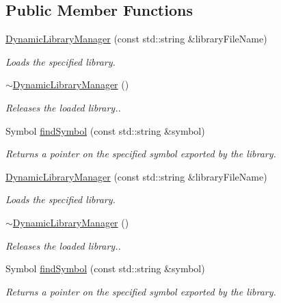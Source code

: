 \subsection*{Public Member Functions}
\begin{DoxyCompactItemize}
\item 
\hyperlink{class_dynamic_library_manager_ab7ae32f147f2cdd809df718d70fc7ff2}{Dynamic\+Library\+Manager} (const std\+::string \&library\+File\+Name)
\begin{DoxyCompactList}\small\item\em Loads the specified library. \end{DoxyCompactList}\item 
\hypertarget{class_dynamic_library_manager_a1c6a30a61161a8ddb96279bfb44c44c7}{\hyperlink{class_dynamic_library_manager_a1c6a30a61161a8ddb96279bfb44c44c7}{$\sim$\+Dynamic\+Library\+Manager} ()}\label{class_dynamic_library_manager_a1c6a30a61161a8ddb96279bfb44c44c7}

\begin{DoxyCompactList}\small\item\em Releases the loaded library.. \end{DoxyCompactList}\item 
Symbol \hyperlink{class_dynamic_library_manager_ab3be27b46be1c7ab20e1b656da16f770}{find\+Symbol} (const std\+::string \&symbol)
\begin{DoxyCompactList}\small\item\em Returns a pointer on the specified symbol exported by the library. \end{DoxyCompactList}\item 
\hyperlink{class_dynamic_library_manager_a26d6592077763d9eb31d66d02d17b8d4}{Dynamic\+Library\+Manager} (const std\+::string \&library\+File\+Name)
\begin{DoxyCompactList}\small\item\em Loads the specified library. \end{DoxyCompactList}\item 
\hypertarget{class_dynamic_library_manager_a1c6a30a61161a8ddb96279bfb44c44c7}{\hyperlink{class_dynamic_library_manager_a1c6a30a61161a8ddb96279bfb44c44c7}{$\sim$\+Dynamic\+Library\+Manager} ()}\label{class_dynamic_library_manager_a1c6a30a61161a8ddb96279bfb44c44c7}

\begin{DoxyCompactList}\small\item\em Releases the loaded library.. \end{DoxyCompactList}\item 
Symbol \hyperlink{class_dynamic_library_manager_a2bd337473432b0f470f5bb987da77239}{find\+Symbol} (const std\+::string \&symbol)
\begin{DoxyCompactList}\small\item\em Returns a pointer on the specified symbol exported by the library. \end{DoxyCompactList}\end{DoxyCompactItemize}


